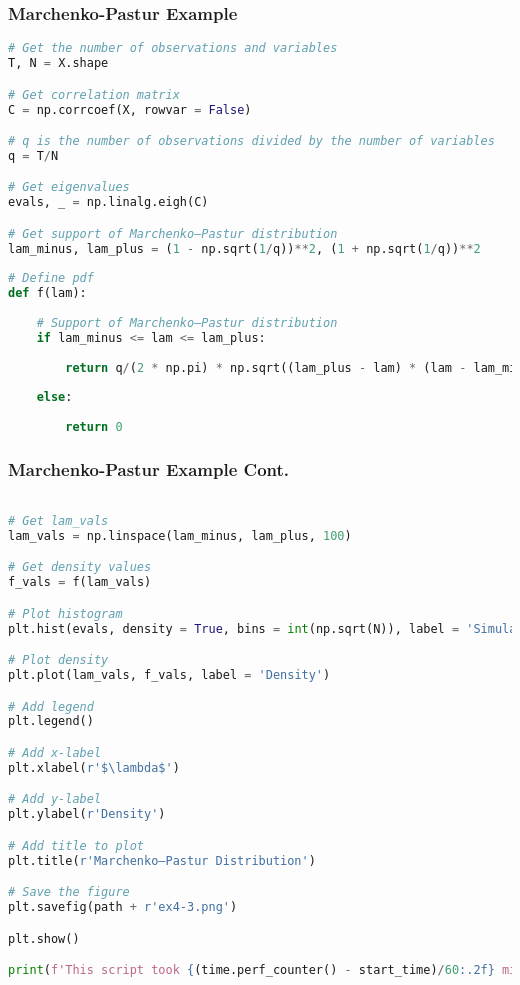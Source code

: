 \documentclass{beamer}
\begin{document}
\begin{frame}[fragile]
\frametitle{Marchenko-Pastur Example}

\begin{lstlisting}[language=Python]
# Get the number of observations and variables
T, N = X.shape

# Get correlation matrix
C = np.corrcoef(X, rowvar = False)

# q is the number of observations divided by the number of variables
q = T/N

# Get eigenvalues
evals, _ = np.linalg.eigh(C)

# Get support of Marchenko–Pastur distribution
lam_minus, lam_plus = (1 - np.sqrt(1/q))**2, (1 + np.sqrt(1/q))**2 
        
# Define pdf
def f(lam):
    
    # Support of Marchenko–Pastur distribution
    if lam_minus <= lam <= lam_plus:
    
        return q/(2 * np.pi) * np.sqrt((lam_plus - lam) * (lam - lam_minus))/lam
                
    else:
        
        return 0

\end{lstlisting}
\end{frame}



\begin{frame}[fragile]
\frametitle{Marchenko-Pastur Example Cont.}

\begin{lstlisting}[language=Python]

# Get lam_vals
lam_vals = np.linspace(lam_minus, lam_plus, 100)

# Get density values
f_vals = f(lam_vals)

# Plot histogram
plt.hist(evals, density = True, bins = int(np.sqrt(N)), label = 'Simulated Distribution')

# Plot density
plt.plot(lam_vals, f_vals, label = 'Density')

# Add legend
plt.legend()

# Add x-label
plt.xlabel(r'$\lambda$')

# Add y-label
plt.ylabel(r'Density')

# Add title to plot
plt.title(r'Marchenko–Pastur Distribution')

# Save the figure
plt.savefig(path + r'ex4-3.png')

plt.show()

print(f'This script took {(time.perf_counter() - start_time)/60:.2f} minutes to run.')
\end{lstlisting}

\end{frame}
\end{document}
